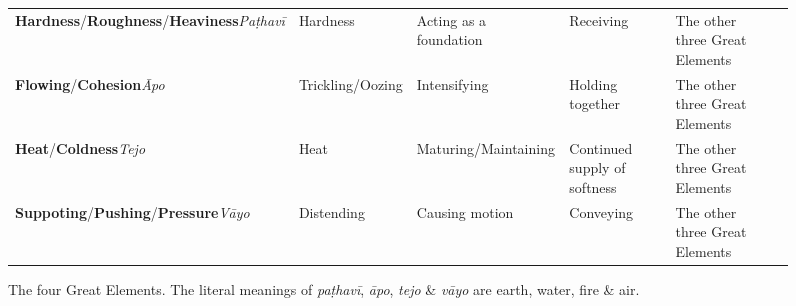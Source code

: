 \begin{figure} [H]

\setlength{\tabcolsep}{0pt}
\renewcommand{\arraystretch}{1.1}

\noindent\begin{tabular}{P{0.25\textwidth} | C{.185\textwidth} C{0.185\textwidth} C{0.185\textwidth} C{0.195\textwidth} m{0mm}}
\toprule
 &  &  &  & \\
\midrule
\textbf{Hardness}/\newline \textbf{Roughness}/\newline \textbf{Heaviness}\newline \textit{Paṭhavī} & Hardness & Acting as a foundation & Receiving & The other three Great Elements &\\[15mm]
\textbf{Flowing}/\newline \textbf{Cohesion}\newline \textit{Āpo} & Trickling/\newline Oozing & Intensifying & Holding together & The other three Great Elements &\\[15mm]
\textbf{Heat}/\newline \textbf{Coldness}\newline \textit{Tejo} & Heat & Maturing/\newline Maintaining & Continued supply of softness & The other three Great Elements &\\[15mm]
\textbf{Suppoting}/\newline \textbf{Pushing}/\newline \textbf{Pressure}\newline \textit{Vāyo} & Distending & Causing motion & Conveying & The other three Great Elements &\\[15mm]
\bottomrule
\end{tabular} 

\caption[]{The four Great Elements. The literal meanings of \textit{paṭhavī}, \textit{āpo}, \textit{tejo} \& \textit{vāyo} are earth, water, fire \& air.\footnotemark}

\end{figure}


